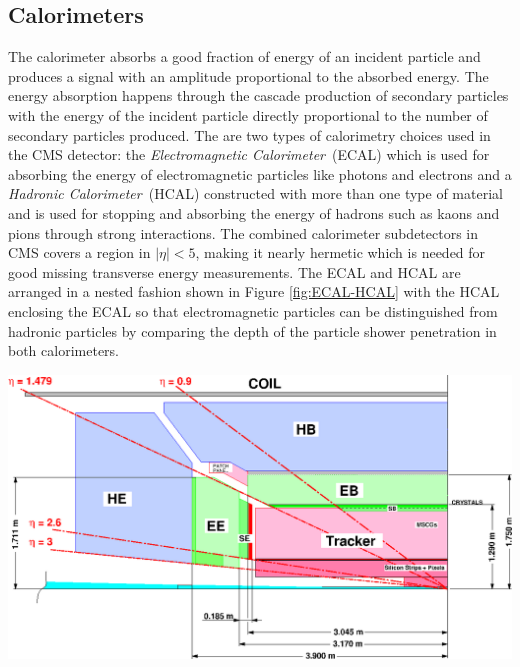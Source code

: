 \subsection{Calorimeters}
The calorimeter absorbs a good fraction of energy of an incident particle and produces a signal with an amplitude proportional to the absorbed energy. The energy absorption happens through the cascade production of secondary particles with the energy of the incident particle directly proportional to the number of secondary particles produced. The are two types of calorimetry choices used in the CMS detector: the \textit{Electromagnetic Calorimeter}~(ECAL) which is used for absorbing the energy of electromagnetic particles like photons and electrons and a \textit{Hadronic Calorimeter}~(HCAL) constructed with more than one type of material and is used for stopping and absorbing the energy of hadrons such as kaons and pions through strong interactions. The combined calorimeter subdetectors in CMS covers a region in $|\eta| < 5$, making it nearly hermetic which is needed for good missing transverse energy measurements. The ECAL and HCAL are arranged in a nested fashion shown in Figure \ref{fig:ECAL-HCAL} with the HCAL enclosing the ECAL so that electromagnetic particles can be distinguished from hadronic particles by comparing the depth of the particle shower penetration in both calorimeters.

\begin{center}
\centering
\mbox{\includegraphics[scale=0.5]{THESISPLOTS/ECAL-HCAL.eps}} 
\label{fig:ECAL-HCAL}
\end{center}
